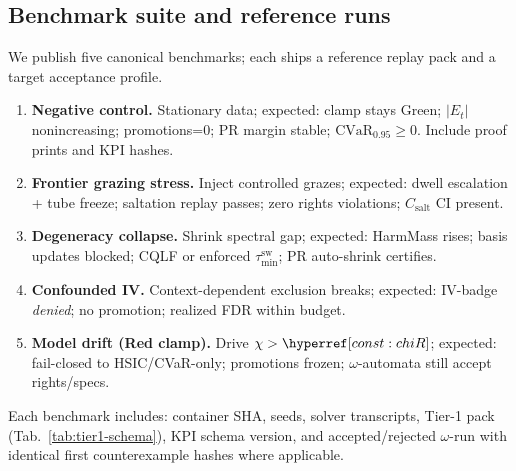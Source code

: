 \subsection{Benchmark suite and reference runs}\label{subsec:bench}
\emph{}

We publish five canonical benchmarks; each ships a reference replay pack and a target acceptance profile.

\begin{enumerate}[leftmargin=*]
\item \textbf{Negative control.} Stationary data; expected: clamp stays Green; $|E_t|$ nonincreasing; promotions=0; PR margin stable; $\mathrm{CVaR}_{0.95}\!\ge\!0$. Include proof prints and KPI hashes.
\item \textbf{Frontier grazing stress.} Inject controlled grazes; expected: dwell escalation + tube freeze; saltation replay passes; zero rights violations; $C_{\text{salt}}$ CI present.
\item \textbf{Degeneracy collapse.} Shrink spectral gap; expected: HarmMass rises; basis updates blocked; CQLF or enforced $\tau_{\min}^{\mathrm{sw}}$; PR auto-shrink certifies.
\item \textbf{Confounded IV.} Context-dependent exclusion breaks; expected: IV-badge \emph{denied}; no promotion; realized FDR within budget.
\item \textbf{Model drift (Red clamp).} Drive $\chi>\constref{chiR}$; expected: fail-closed to HSIC/CVaR-only; promotions frozen; $\omega$-automata still accept rights/specs.
\end{enumerate}

Each benchmark includes: container SHA, seeds, solver transcripts, Tier-1 pack (Tab.~\ref{tab:tier1-schema}), KPI schema version, and accepted/rejected $\omega$-run with identical first counterexample hashes where applicable.


